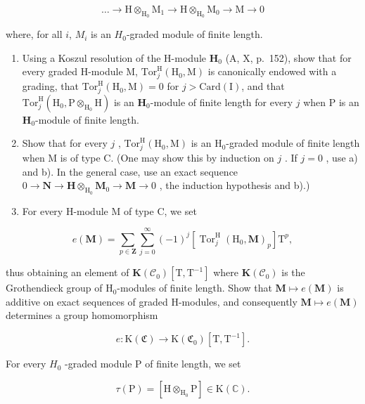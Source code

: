 \[
\dots \rightarrow \mathrm{H} \otimes_ {\mathrm{H} _ {0}} \mathrm{M} _ {1} \rightarrow \mathrm{H} \otimes_ {\mathrm{H} _ {0}} \mathrm{M} _ {0} \rightarrow \mathrm{M} \rightarrow 0
\]

where, for all \(i\), \(M_{i}\) is an \(H_{0}\)-graded module of finite length.

\begin{enumerate}
\def\labelenumi{\alph{enumi})}
\setcounter{enumi}{1}
\item
  Using a Koszul resolution of the H-module \(\mathbf{H}_0\) (A, X, p.~152), show that for every graded H-module M, \(\mathrm{Tor}_j^{\mathrm{H}}(\mathrm{H}_0,\mathrm{M})\) is canonically endowed with a grading, that \(\mathrm{Tor}_j^{\mathrm{H}}(\mathrm{H}_0,\mathrm{M}) = 0\) for \(j > \mathrm{Card}(\mathrm{I})\), and that \(\mathrm{Tor}_j^{\mathrm{H}}(\mathrm{H}_0,\mathrm{P}\otimes_{\mathrm{H}_0}\mathrm{H})\) is an \(\mathbf{H}_0\)-module of finite length for every \(j\) when P is an \(\mathbf{H}_0\)-module of finite length.
\item
  Show that for every \(j\) , \(\mathrm{Tor}_{j}^{\mathrm{H}}(\mathrm{H}_{0}, \mathrm{M})\) is an \(\mathrm{H}_{0}\)-graded module of finite length when M is of type C. (One may show this by induction on \(j\) . If \(j = 0\) , use a) and b). In the general case, use an exact sequence \(0 \to \mathbf{N} \to \mathbf{H} \otimes_{\mathrm{H}_{0}} \mathbf{M}_{0} \to \mathbf{M} \to 0\) , the induction hypothesis and b).)
\item
  For every H-module M of type C, we set
\end{enumerate}

\[
e (\mathbf {M}) = \sum_ {p \in \mathbf {Z}} \sum_ {j = 0} ^ {\infty} (- 1) ^ {j} [ \operatorname{Tor} _ {j} ^ {\mathrm{H}} (\mathrm{H} _ {0}, \mathbf {M}) _ {p} ] \mathrm{T} ^ {p},
\]

  thus obtaining an element of \(\mathbf{K}(\mathcal{C}_{0})[\mathrm{T},\mathrm{T}^{-1}]\) where \(\mathbf{K}(\mathcal{C}_{0})\) is the Grothendieck group of \(\mathrm{H}_{0}\)-modules of finite length. Show that \(\mathbf{M}\mapsto e(\mathbf{M})\) is additive on exact sequences of graded H-modules, and consequently \(\mathbf{M}\mapsto e(\mathbf{M})\) determines a group homomorphism

\[
e: \mathrm{K} (\mathfrak {C}) \to \mathrm{K} (\mathfrak {C} _ {0}) [ \mathrm{T}, \mathrm{T} ^ {- 1} ].
\]

For every \(H_{0}\) -graded module P of finite length, we set

\[
\tau (\mathrm{P}) = [ \mathrm{H} \otimes_ {\mathrm{H} _ {0}} \mathrm{P} ] \in \mathrm{K} (\mathbb {C}).
\]

